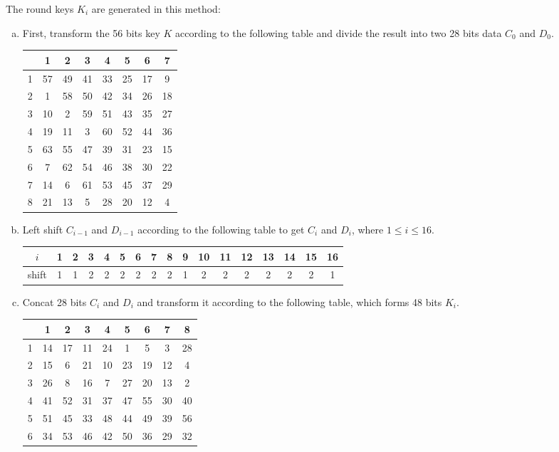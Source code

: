 \documentclass{article}
\begin{document}
\begin{enumerate}
The round keys $K_i$ are generated in this method:
\begin{enumerate}[(a)]
\item
First, transform the 56 bits key $K$ according to the following table and divide the result into two 28 bits data $C_0$ and $D_0$.
\begin{center}
\begin{tabular}{c|ccccccc}
& 1 & 2 & 3 & 4 & 5 & 6 & 7 \\\hline
1 & 57 & 49 & 41 & 33 & 25 & 17 & 9 \\
2 & 1 & 58 & 50 & 42 & 34 & 26 & 18 \\
3 & 10 & 2 & 59 & 51 & 43 & 35 & 27 \\
4 & 19 & 11 & 3 & 60 & 52 & 44 & 36 \\
5 & 63 & 55 & 47 & 39 & 31 & 23 & 15 \\
6 & 7 & 62 & 54 & 46 & 38 & 30 & 22 \\
7 & 14 & 6 & 61 & 53 & 45 & 37 & 29 \\
8 & 21 & 13 & 5 & 28 & 20 & 12 & 4 \\
\end{tabular}
\end{center}
\item
Left shift $C_{i-1}$ and $D_{i-1}$ according to the following table to get $C_i$ and $D_i$, where $1\leqslant i\leqslant16$.
\begin{center}
\begin{tabular}{c|cccccccccccccccc}
$i$ & 1 & 2 & 3 & 4 & 5 & 6 & 7 & 8 & 9 & 10 & 11 & 12 & 13 & 14 & 15 & 16 \\\hline
shift & 1 & 1 & 2 & 2 & 2 & 2 & 2 & 2 & 1 & 2 & 2 & 2 & 2 & 2 & 2 & 1
\end{tabular}
\end{center}
\item
Concat 28 bits $C_i$ and $D_i$ and transform it according to the following table, which forms 48 bits $K_i$.
\begin{center}
\begin{tabular}{c|cccccccc}
& 1 & 2 & 3 & 4 & 5 & 6 & 7 & 8 \\\hline
1 & 14 & 17 & 11 & 24 & 1 & 5 & 3 & 28 \\
2 & 15 & 6 & 21 & 10 & 23 & 19 & 12 & 4 \\
3 & 26 & 8 & 16 & 7 & 27 & 20 & 13 & 2 \\
4 & 41 & 52 & 31 & 37 & 47 & 55 & 30 & 40 \\
5 & 51 & 45 & 33 & 48 & 44 & 49 & 39 & 56 \\
6 & 34 & 53 & 46 & 42 & 50 & 36 & 29 & 32 \\
\end{tabular}
\end{center}
\end{enumerate}


\end{enumerate}
\end{document}
